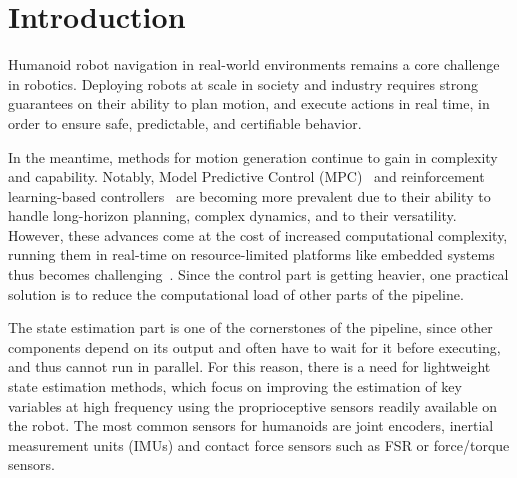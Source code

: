 \documentclass[10pt,twocolumn]{ICCAS}
\begin{document}

\maketitle


\section{Introduction}

Humanoid robot navigation in real-world environments remains a core challenge in robotics. Deploying robots at scale in society and industry requires strong guarantees on their ability to plan motion, and execute actions in real time, in order to ensure safe, predictable, and certifiable behavior.

In the meantime, methods for motion generation continue to gain in complexity and capability. Notably, Model Predictive Control (MPC)~\cite{Dallard2024AdiosStabilizers} and reinforcement learning-based controllers~\cite{Peters2003ReinforcmentLearningForHumanoid} are becoming more prevalent due to their ability to handle long-horizon planning, complex dynamics, and to their versatility. However, these advances come at the cost of increased computational complexity, running them in real-time on resource-limited platforms like embedded systems thus becomes challenging~\cite{findeisen2004computationalDelayNMPC}. Since the control part is getting heavier, one practical solution is to reduce the computational load of other parts of the pipeline. 

The state estimation part is one of the cornerstones of the pipeline, since other components depend on its output and often have to wait for it before executing, and thus cannot run in parallel. For this reason, there is a need for lightweight state estimation methods, which focus on improving the estimation of key variables at high frequency using the proprioceptive sensors readily available on the robot. The most common sensors for humanoids are joint encoders, inertial measurement units (IMUs) and contact force sensors such as FSR or force/torque sensors.
\end{document}
